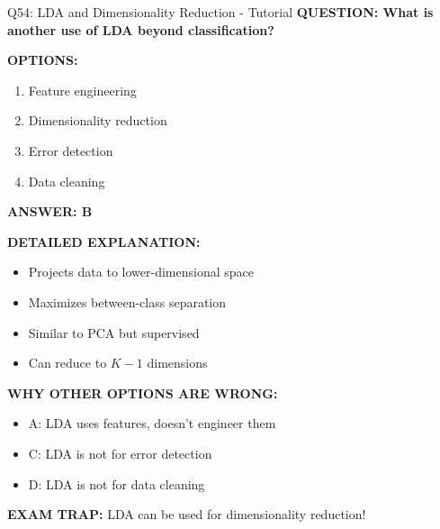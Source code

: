 \documentclass[8pt]{beamer}
\begin{document}
\begin{frame}{Q54: LDA and Dimensionality Reduction - Tutorial}
	\fontsize{6.5}{7.5}\selectfont
	\textbf{QUESTION: What is another use of LDA beyond classification?}
	
	\vspace{0.1cm}
	\textbf{OPTIONS:}
	\begin{enumerate}
		\item Feature engineering
		\item Dimensionality reduction
		\item Error detection
		\item Data cleaning
	\end{enumerate}
	
	\vspace{0.1cm}
	\textcolor{myblue}{\textbf{ANSWER: B}}
	
	\vspace{0.1cm}
	\textbf{DETAILED EXPLANATION:}
	\begin{itemize}
		\item Projects data to lower-dimensional space
		\item Maximizes between-class separation
		\item Similar to PCA but supervised
		\item Can reduce to $K-1$ dimensions
	\end{itemize}
	
	\vspace{0.1cm}
	\textcolor{myred}{\textbf{WHY OTHER OPTIONS ARE WRONG:}}
	\begin{itemize}
		\item \textcolor{myred}{A:} LDA uses features, doesn't engineer them
		\item \textcolor{myred}{C:} LDA is not for error detection
		\item \textcolor{myred}{D:} LDA is not for data cleaning
	\end{itemize}
	
	\textcolor{myred}{\textbf{EXAM TRAP:}} LDA can be used for \textcolor{myblue}{dimensionality reduction}!
\end{frame}
\end{document}
